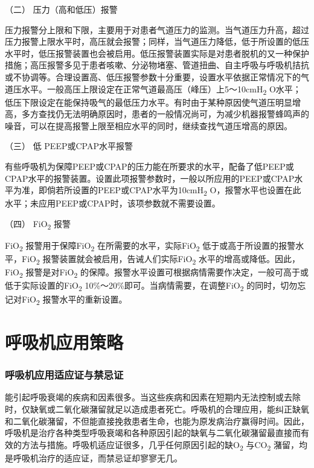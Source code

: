 \hypertarget{text00370.htmlux5cux23CHP16-3-4-3-2}{}
（二） 压力（高和低压）报警

压力报警分上限和下限，主要用于对患者气道压力的监测。当气道压力升高，超过压力报警上限水平时，高压就会报警；同样，当气道压力降低，低于所设置的低压水平时，低压报警装置也会被启用。低压报警装置实际是对患者脱机的又一种保护措施；高压报警多见于患者咳嗽、分泌物堵塞、管道扭曲、自主呼吸与呼吸机拮抗或不协调等。合理设置高、低压报警参数十分重要，设置水平依据正常情况下的气道压水平。一般高压上限设定在正常气道最高压（峰压）上5～10cmH\textsubscript{2}
O水平；低压下限设定在能保持吸气的最低压力水平。有时由于某种原因使气道压明显增高，多方查找仍无法明确原因时，患者的一般情况尚可，为减少机器报警蜂鸣声的噪音，可以在提高报警上限至相应水平的同时，继续查找气道压增高的原因。

\hypertarget{text00370.htmlux5cux23CHP16-3-4-3-3}{}
（三） 低 PEEP或CPAP水平报警

有些呼吸机为保障PEEP或CPAP的压力能在所要求的水平，配备了低PEEP或CPAP水平的报警装置。设置此项报警参数时，一般以所应用的PEEP或CPAP水平为准，即倘若所设置的PEEP或CPAP水平为10cmH\textsubscript{2}
O，报警水平也设置在此水平；未应用PEEP或CPAP时，该项参数就不需要设置。

\hypertarget{text00370.htmlux5cux23CHP16-3-4-3-4}{}
（四） FiO\textsubscript{2} 报警

FiO\textsubscript{2} 报警用于保障FiO\textsubscript{2}
在所需要的水平，实际FiO\textsubscript{2}
低于或高于所设置的报警水平，FiO\textsubscript{2}
报警装置就会被启用，告诫人们实际FiO\textsubscript{2}
水平的增高或降低。因此，FiO\textsubscript{2}
报警是对FiO\textsubscript{2}
的保障。报警水平设置可根据病情需要作决定，一般可高于或低于实际设置的FiO\textsubscript{2}
10\%～20\%即可。当病情需要，在调整FiO\textsubscript{2}
的同时，切勿忘记对FiO\textsubscript{2} 报警水平的重新设置。

\protect\hypertarget{text00371.html}{}{}

\section{呼吸机应用策略}

\subsubsection{呼吸机应用适应证与禁忌证}

能引起呼吸衰竭的疾病和因素很多。当这些疾病和因素在短期内无法控制或去除时，仅缺氧或二氧化碳潴留就足以造成患者死亡。呼吸机的合理应用，能纠正缺氧和二氧化碳潴留，不但能直接挽救患者生命，也能为原发病治疗赢得时间。因此，呼吸机是治疗各种类型呼吸衰竭和各种原因引起的缺氧与二氧化碳潴留最直接而有效的方法与措施。呼吸机适应证很多，几乎任何原因引起的缺O\textsubscript{2}
与CO\textsubscript{2} 潴留，均是呼吸机治疗的适应证，而禁忌证却寥寥无几。

